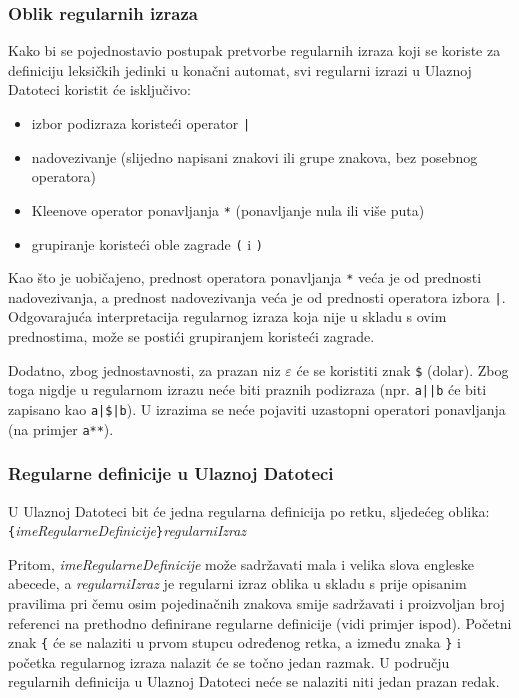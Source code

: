 \documentclass[times, 12pt, utf8]{book}
\begin{document}
\subsubsection*{Oblik regularnih izraza}
Kako bi se pojednostavio postupak pretvorbe regularnih izraza koji se koriste za definiciju leksičkih jedinki u konačni automat, svi regularni izrazi u Ulaznoj Datoteci koristit će isključivo:
\begin{itemize}
\itemsep 1pt
\item izbor podizraza koristeći operator \verb=|=
\item nadovezivanje (slijedno napisani znakovi ili grupe znakova, bez posebnog operatora)
\item Kleenove operator ponavljanja \verb=*= (ponavljanje nula ili više puta)
\item grupiranje koristeći oble zagrade \verb=(= i \verb=)=
\end{itemize}

Kao što je uobičajeno, prednost operatora ponavljanja \verb=*= veća je od prednosti nadovezivanja, a prednost nadovezivanja veća je od prednosti operatora izbora \verb=|=.
Odgovarajuća interpretacija regularnog izraza koja nije u skladu s ovim prednostima, može se postići grupiranjem koristeći zagrade.

Dodatno, zbog jednostavnosti, za prazan niz \(\varepsilon\) će se koristiti znak \verb=$= (dolar).
Zbog toga nigdje u regularnom izrazu neće biti praznih podizraza (npr. \verb=a||b= će biti zapisano kao \verb=a|$|b=).
U izrazima se neće pojaviti uzastopni operatori ponavljanja (na primjer \verb=a**=).

\subsubsection*{Regularne definicije u Ulaznoj Datoteci}
U Ulaznoj Datoteci bit će jedna regularna definicija po retku, sljedećeg oblika:\\
\verb|{|\emph{imeRegularneDefinicije}\verb|}|\textvisiblespace\emph{regularniIzraz}

Pritom, \emph{imeRegularneDefinicije} može sadržavati mala i velika slova engleske abecede, a \emph{regularniIzraz} je regularni izraz oblika u skladu s prije opisanim pravilima pri čemu osim pojedinačnih znakova smije sadržavati i proizvoljan broj referenci na prethodno definirane regularne definicije (vidi primjer ispod).
Početni znak \verb|{| će se nalaziti u prvom stupcu određenog retka, a između znaka \verb|}| i početka regularnog izraza nalazit će se točno jedan razmak.
U području regularnih definicija u Ulaznoj Datoteci neće se nalaziti niti jedan prazan redak.
\end{document}
